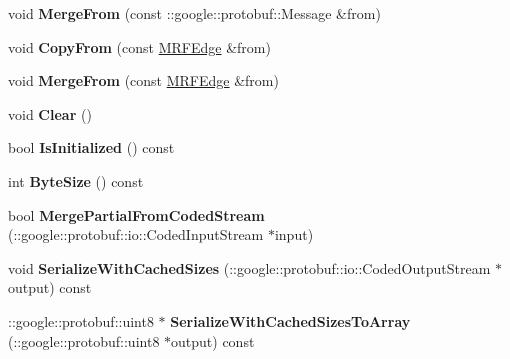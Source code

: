 \begin{DoxyCompactItemize}
\item 
\hypertarget{classgraph_1_1MRFEdge_a83fe505e1c12d298d726853b09e566ad}{
void {\bfseries MergeFrom} (const ::google::protobuf::Message \&from)}
\label{classgraph_1_1MRFEdge_a83fe505e1c12d298d726853b09e566ad}

\item 
\hypertarget{classgraph_1_1MRFEdge_a432538f9cc47eaf753e771a1b6cb9a81}{
void {\bfseries CopyFrom} (const \hyperlink{classgraph_1_1MRFEdge}{MRFEdge} \&from)}
\label{classgraph_1_1MRFEdge_a432538f9cc47eaf753e771a1b6cb9a81}

\item 
\hypertarget{classgraph_1_1MRFEdge_a861a18199b5be517a96cd5b355a3c668}{
void {\bfseries MergeFrom} (const \hyperlink{classgraph_1_1MRFEdge}{MRFEdge} \&from)}
\label{classgraph_1_1MRFEdge_a861a18199b5be517a96cd5b355a3c668}

\item 
\hypertarget{classgraph_1_1MRFEdge_ab9d3b2159e6b42fe5fe5f3c4840a151b}{
void {\bfseries Clear} ()}
\label{classgraph_1_1MRFEdge_ab9d3b2159e6b42fe5fe5f3c4840a151b}

\item 
\hypertarget{classgraph_1_1MRFEdge_a11b542bb15495a1fbee395763ee4e22d}{
bool {\bfseries IsInitialized} () const }
\label{classgraph_1_1MRFEdge_a11b542bb15495a1fbee395763ee4e22d}

\item 
\hypertarget{classgraph_1_1MRFEdge_ae857214ec9afbe8246f3027afb231770}{
int {\bfseries ByteSize} () const }
\label{classgraph_1_1MRFEdge_ae857214ec9afbe8246f3027afb231770}

\item 
\hypertarget{classgraph_1_1MRFEdge_abb481822efd72255228c00617b26a9b8}{
bool {\bfseries MergePartialFromCodedStream} (::google::protobuf::io::CodedInputStream $\ast$input)}
\label{classgraph_1_1MRFEdge_abb481822efd72255228c00617b26a9b8}

\item 
\hypertarget{classgraph_1_1MRFEdge_a8b119214980a5375a373bf7acf38f841}{
void {\bfseries SerializeWithCachedSizes} (::google::protobuf::io::CodedOutputStream $\ast$output) const }
\label{classgraph_1_1MRFEdge_a8b119214980a5375a373bf7acf38f841}

\item 
\hypertarget{classgraph_1_1MRFEdge_ac711eeb7dd9dec6fafde05f93adc7092}{
::google::protobuf::uint8 $\ast$ {\bfseries SerializeWithCachedSizesToArray} (::google::protobuf::uint8 $\ast$output) const }
\label{classgraph_1_1MRFEdge_ac711eeb7dd9dec6fafde05f93adc7092}


\end{DoxyCompactItemize}
